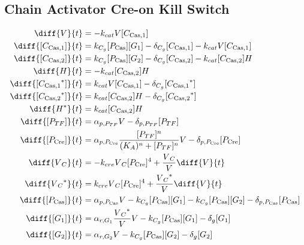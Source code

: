 \subsection{Chain Activator Cre-on Kill Switch}
\label{s:Chain_Activator_Cre_on_Kill_Switch}

\begin{align}
\diff{\vectorGen{}}{t} & = - \casCutRate{{}}\vectorGen{}\conc{\cplx{\cas}{1}}\\
\diff{\conc{\cplx{\cas}{1}}}{t} & =  \gRnaBind{}\conc{\proSp{\cas{}}}\conc{\gRna{1}} - \casCompDegradeRate{}\conc{\cplx{\cas}{1}} - \casCutRate{{}}\vectorGen{}\conc{\cplx{\cas}{1}}\\
\diff{\conc{\cplx{\cas}{2}}}{t} & =  \gRnaBind{}\conc{\proSp{\cas{}}}\conc{\gRna{2}} - \casCompDegradeRate{}\conc{\cplx{\cas}{2}} - \casCutRate{{}}\conc{\cplx{\cas}{2}}\hostGen{}\\
\diff{\hostGen{}}{t} & = - \casCutRate{{}}\conc{\cplx{\cas}{2}}\hostGen{}\\
\diff{\conc{\bound{\cplx{\cas}{1}}}}{t} & =  \casCutRate{{}}\vectorGen{}\conc{\cplx{\cas}{1}} - \casCompDegradeRate{}\conc{\bound{\cplx{\cas}{1}}}\\
\diff{\conc{\bound{\cplx{\cas}{2}}}}{t} & =  \casCutRate{{}}\conc{\cplx{\cas}{2}}\hostGen{} - \casCompDegradeRate{}\conc{\bound{\cplx{\cas}{2}}}\\
\diff{\edited{\hostGen{}}}{t} & =  \casCutRate{{}}\conc{\cplx{\cas}{2}}\hostGen{}\\
\diff{\conc{\proSp{TF}}}{t} & =  \txtlRate{\proSp{TF}}\vectorGen{} - \proDegradeRate{\proSp{TF}}\conc{\proSp{TF}}\\
\diff{\conc{\proSp{\cre{}}}}{t} & =  \txtlRate{\proSp{\cre{}}}\frac{\conc{\proSp{TF}}^n}{(K_A)^n + \conc{\proSp{TF}}^n}\vectorGen{} - \proDegradeRate{\proSp{\cre{}}}\conc{\proSp{\cre{}}}\\
\diff{\vectorGen{}_C}{t} & = - \creCutRate{} \vectorGen{}_C \conc{\proSp{\cre{}}}^4 + \frac{\vectorGen{}_C}{\vectorGen{}} \diff{\vectorGen{}}{t}\\
\diff{\edited{\vectorGen{}_C}}{t} & =  \creCutRate{} \vectorGen{}_C \conc{\proSp{\cre{}}}^4 + \frac{\edited{\vectorGen{}_C}}{\vectorGen{}} \diff{\vectorGen{}}{t}\\
\diff{\conc{\proSp{\cas{}}}}{t} & =  \txtlRate{\proSp{\cas{}}}\vectorGen{} - \gRnaBind{}\conc{\proSp{\cas{}}}\conc{\gRna{1}} - \gRnaBind{}\conc{\proSp{\cas{}}}\conc{\gRna{2}} - \proDegradeRate{\proSp{\cas{}}}\conc{\proSp{\cas{}}}\\
\diff{\conc{\gRna{1}}}{t} & =  \txRate{\gRna{1}}\frac{\edited{\vectorGen{}_C}}{\vectorGen{}}\vectorGen{} - \gRnaBind{}\conc{\proSp{\cas{}}}\conc{\gRna{1}} - \rnaDegradeRate{}\conc{\gRna{1}}\\
\diff{\conc{\gRna{2}}}{t} & =  \txRate{\gRna{2}}\vectorGen{} - \gRnaBind{}\conc{\proSp{\cas{}}}\conc{\gRna{2}} - \rnaDegradeRate{}\conc{\gRna{2}}
\end{align}

